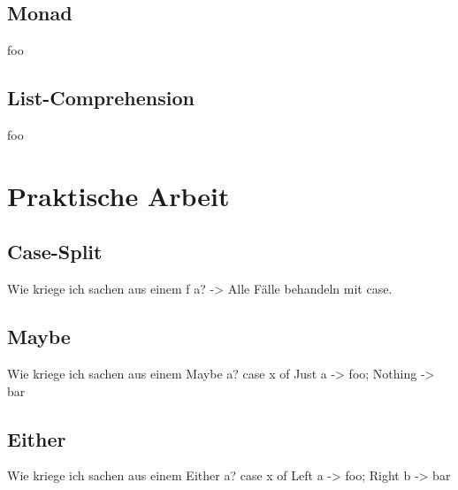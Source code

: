 \documentclass{beamer}
\begin{document}
\subsection{Monad}
\begin{frame}
 foo
\end{frame}

\subsection{List-Comprehension}
\begin{frame}
 foo
\end{frame}

\section{Praktische Arbeit}

\subsection{Case-Split}
\begin{frame}
 Wie kriege ich sachen aus einem f a? -> Alle Fälle behandeln mit case.
\end{frame}
\subsection{Maybe}
\begin{frame}
 Wie kriege ich sachen aus einem Maybe a? case x of Just a -> foo; Nothing -> bar
\end{frame}
\subsection{Either}
\begin{frame}
 Wie kriege ich sachen aus einem Either a? case x of Left a -> foo; Right b -> bar
\end{frame}
\end{document}
